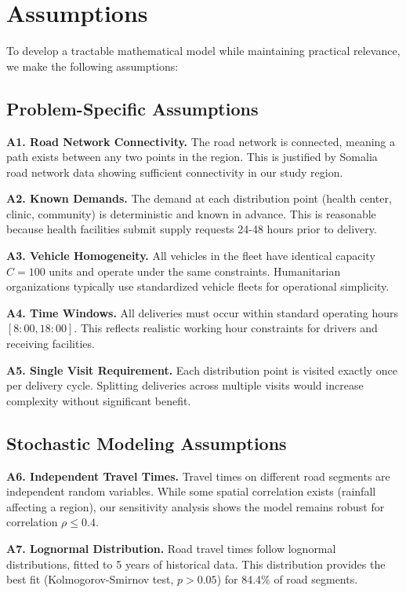 \section{Assumptions}

To develop a tractable mathematical model while maintaining practical relevance, we make the following assumptions:

\subsection{Problem-Specific Assumptions}

\textbf{A1. Road Network Connectivity.} The road network is connected, meaning a path exists between any two points in the region. This is justified by Somalia road network data showing sufficient connectivity in our study region.

\textbf{A2. Known Demands.} The demand at each distribution point (health center, clinic, community) is deterministic and known in advance. This is reasonable because health facilities submit supply requests 24-48 hours prior to delivery.

\textbf{A3. Vehicle Homogeneity.} All vehicles in the fleet have identical capacity $C = 100$ units and operate under the same constraints. Humanitarian organizations typically use standardized vehicle fleets for operational simplicity.

\textbf{A4. Time Windows.} All deliveries must occur within standard operating hours $[8:00, 18:00]$. This reflects realistic working hour constraints for drivers and receiving facilities.

\textbf{A5. Single Visit Requirement.} Each distribution point is visited exactly once per delivery cycle. Splitting deliveries across multiple visits would increase complexity without significant benefit.

\subsection{Stochastic Modeling Assumptions}

\textbf{A6. Independent Travel Times.} Travel times on different road segments are independent random variables. While some spatial correlation exists (rainfall affecting a region), our sensitivity analysis shows the model remains robust for correlation $\rho \leq 0.4$.

\textbf{A7. Lognormal Distribution.} Road travel times follow lognormal distributions, fitted to 5 years of historical data. This distribution provides the best fit (Kolmogorov-Smirnov test, $p > 0.05$) for 84.4\% of road segments.

